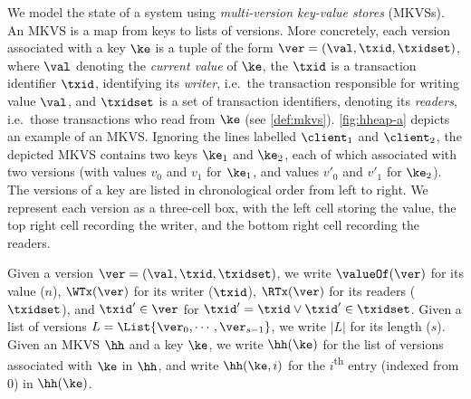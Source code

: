  We model the state of a system using \emph{multi-version key-value stores} (MKVSs). An MKVS is a map from keys to lists of versions.
More concretely, each version associated with a key $\ke$ is a tuple of the form \( \ver =( \val, \txid, \txidset ) \), where $\val$ denoting the \emph{current value} of $\ke$, 
the $\txid$ is a transaction identifier \( \txid \), identifying its \emph{writer}, i.e.\ the transaction responsible for writing value $\val$, and 
$\txidset$ is a set of transaction identifiers, denoting its \emph{readers}, i.e.\ those transactions who read from $\ke$ (see \cref{def:mkvs}).
\cref{fig:hheap-a} depicts an example of an MKVS. 
Ignoring the lines labelled $\client_1$ and $\client_2$, the depicted MKVS contains two keys \( \ke_1\) and \( \ke_2 \), each of which associated with two versions (with values $v_0$ and $v_1$ for $\ke_1$, and values $v'_0$ and $v'_1$ for $\ke_2$).
The versions of a key are listed in chronological order from left to right.
We represent each version as a three-cell box, with the left cell storing the value, the top right cell recording the writer, and the bottom right cell recording the readers. 


Given a version $\ver = (\val, \txid, \txidset)$, we write $\valueOf(\ver)$ for its value ($n$), $\WTx(\ver)$ for its writer ($\txid$), $\RTx(\ver)$ for its readers ($\txidset$), and \( \txid' \in \ver \) for \( \txid' = \txid \lor \txid' \in \txidset \).
Given a list of versions $L = \List{\ver_0, \cdots, \ver_{s-1}}$, we write  $\lvert L\rvert$ for its length ($s$). 
Given an MKVS $\hh$ and a key $\ke$, we write $\hh(\ke)$ for the list of versions associated with $\ke$ in $\hh$, and write \(\hh(\ke,i) \) for the $i$\textsuperscript{th} entry (indexed from $0$) in $\hh(\ke)$. 


